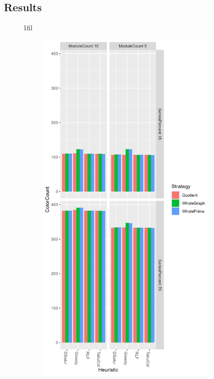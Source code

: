 \documentclass[a4paper]{article}
\makeatletter
\newcommand*{\centerfloat}{%
  \parindent \z@
  \leftskip \z@ \@plus 1fil \@minus \textwidth
  \rightskip\leftskip
  \parfillskip \z@skip}
\makeatother
\begin{document}
\subsection{Results}
\newpage



\begin{figure}
\centerfloat
    \begin{subfigure}{.5\paperwidth}
        \includegraphics[width=\columnwidth]{Tables/1000.png}

\end{subfigure}
\end{figure}
\end{document}
